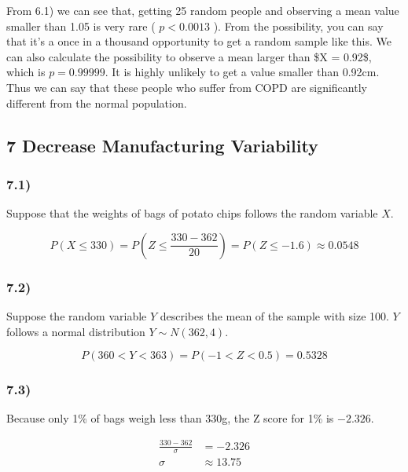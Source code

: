 \documentclass[
]{article}
\begin{document}
From 6.1) we can see that, getting 25 random people and observing a mean
value smaller than 1.05 is very rare ( \(p < 0.0013\) ). From the
possibility, you can say that it's a once in a thousand opportunity to
get a random sample like this. We can also calculate the possibility to
observe a mean larger than \$X = 0.92\$, which is \(p = 0.99999\). It is
highly unlikely to get a value smaller than 0.92cm. Thus we can say that
these people who suffer from COPD are significantly different from the
normal population.

\hypertarget{decrease-manufacturing-variability}{%
\subsection{7 Decrease Manufacturing
Variability}\label{decrease-manufacturing-variability}}

\hypertarget{section-8}{%
\subsubsection{7.1)}\label{section-8}}

Suppose that the weights of bags of potato chips follows the random
variable \(X\).

\[
P(X \leq 330) = P(Z \leq \frac{330 - 362}{20} ) = P( Z\leq -1.6) \approx 0.0548
\]

\hypertarget{section-9}{%
\subsubsection{7.2)}\label{section-9}}

Suppose the random variable \(Y\) describes the mean of the sample with
size 100. \(Y\) follows a normal distribution \(Y \sim N(362, 4)\).

\[
P(360 < Y < 363) = P( -1 < Z < 0.5) = 0.5328
\]

\hypertarget{section-10}{%
\subsubsection{7.3)}\label{section-10}}

Because only 1\% of bags weigh less than 330g, the Z score for 1\% is
\(-2.326\).

\[
\begin{aligned}
\frac{330 - 362}{\sigma} &= -2.326 \\
\sigma &\approx 13.75
\end{aligned}
\]
\end{document}
